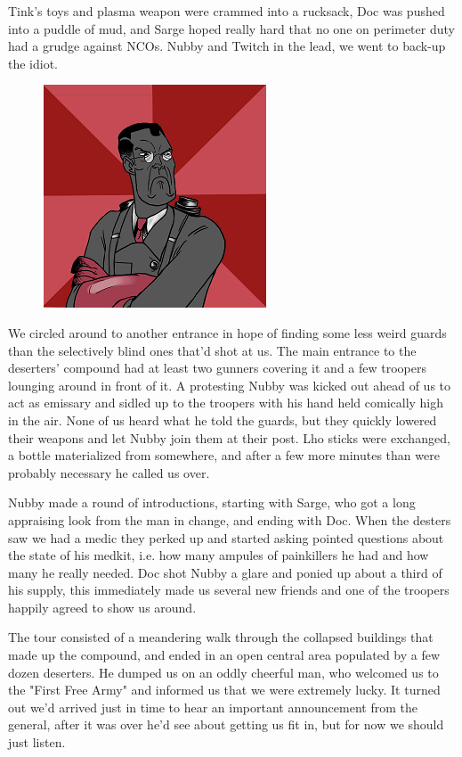 Tink's toys and plasma weapon were crammed into a rucksack, Doc was pushed into a puddle of mud, and Sarge hoped really hard that no one on perimeter duty had a grudge against NCOs. 
Nubby and Twitch in the lead, we went to back-up the idiot.

\begin{figure}
	\begin{center}
		\includegraphics[width=\figwidth]{pics/9/25.png}
	\end{center}
\end{figure}
We circled around to another entrance in hope of finding some less weird guards than the selectively blind ones that'd shot at us. 
The main entrance to the deserters' compound had at least two gunners covering it and a few troopers lounging around in front of it. 
A protesting Nubby was kicked out ahead of us to act as emissary and sidled up to the troopers with his hand held comically high in the air. 
None of us heard what he told the guards, but they quickly lowered their weapons and let Nubby join them at their post. 
Lho sticks were exchanged, a bottle materialized from somewhere, and after a few more minutes than were probably necessary he called us over.

Nubby made a round of introductions, starting with Sarge, who got a long appraising look from the man in change, and ending with Doc. 
When the desters saw we had a medic they perked up and started asking pointed questions about the state of his medkit, i.e. 
how many ampules of painkillers he had and how many he really needed. 
Doc shot Nubby a glare and ponied up about a third of his supply, this immediately made us several new friends and one of the troopers happily agreed to show us around. 


The tour consisted of a meandering walk through the collapsed buildings that made up the compound, and ended in an open central area populated by a few dozen deserters. 
He dumped us on an oddly cheerful man, who welcomed us to the "First Free Army" and informed us that we were extremely lucky. 
It turned out we'd arrived just in time to hear an important announcement from the general, after it was over he'd see about getting us fit in, but for now we should just listen. 


